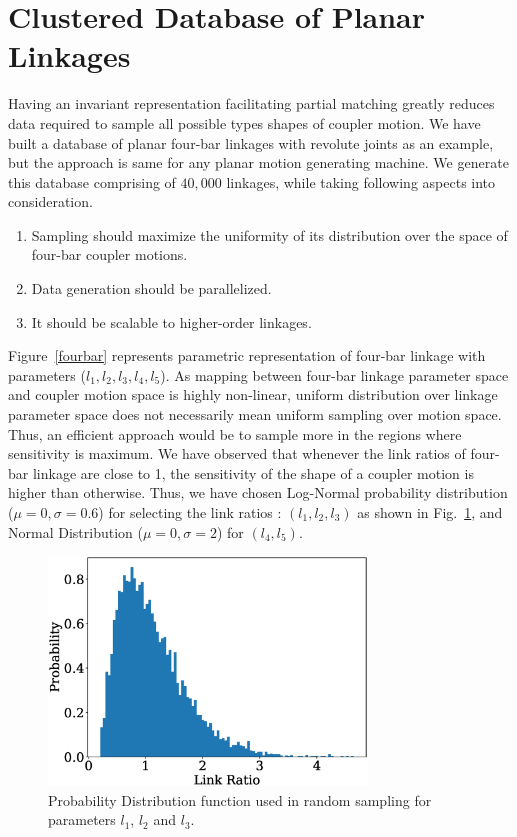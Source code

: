 \documentclass[twocolumn,10pt]{asme2ej}
\begin{document}
\section{Clustered Database of Planar Linkages}\label{sec_db_ae}
Having an invariant representation facilitating partial matching greatly reduces data required to sample all possible types shapes of coupler motion.
We have built a database of planar four-bar linkages with revolute joints as an example, but the approach is same for any planar motion generating machine.
We generate this database comprising of $40,000$ linkages, while taking following aspects into consideration.
\begin{enumerate}
  \item Sampling should maximize the uniformity of its distribution over the space of four-bar coupler motions.
  \item Data generation should be parallelized.
  \item It should be scalable to higher-order linkages.
\end{enumerate}
Figure~\ref{fourbar} represents parametric representation of four-bar linkage with parameters ($l_1,l_2,l_3,l_4,l_5$).
As mapping between four-bar linkage parameter space and coupler motion space is highly non-linear, uniform distribution over linkage parameter space does not necessarily mean uniform sampling over motion space.
Thus, an efficient approach would be to sample more in the regions where sensitivity is maximum.
We have observed that whenever the link ratios of four-bar linkage are close to 1, the sensitivity of the shape of a coupler motion is higher than otherwise.
Thus, we have chosen Log-Normal probability distribution ($\mu = 0,\sigma = 0.6 $) for selecting the link ratios : $(l_1, l_2, l_3)$ as shown in Fig.~\ref{logNormal}, and Normal Distribution ($\mu = 0,\sigma = 2 $) for $(l_4, l_5)$.

\begin{figure}
\centering
\includegraphics[width=240pt]{figure/fig_logNormal.eps}
  \caption{Probability Distribution function used in random sampling for parameters $l_1$, $l_2$ and $l_3$.}
\label{logNormal}
\end{figure}
\end{document}
